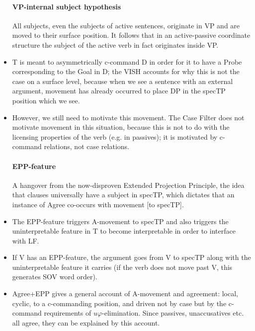 \documentclass{article}
\begin{document}
\begin{itemize}
    \paragraph{VP-internal subject hypothesis} All subjects, even the subjects of active sentences, originate in VP and are moved to their surface position. It follows that in an active-passive coordinate structure the subject of the active verb in fact originates inside VP.
    \item T is meant to asymmetrically c-command D in order for it to have a Probe corresponding to the Goal in D; the VISH accounts for why this is not the case on a surface level, because when we see a sentence with an external argument, movement has already occurred to place DP in the specTP position which we see.
    \item However, we still need to motivate this movement. The Case Filter does not motivate movement in this situation, because this is not to do with the licensing properties of the verb (e.g. in passives); it is motivated by c-command relations, not case relations.
    \paragraph{EPP-feature} A hangover from the now-disproven Extended Projection Principle, the idea that clauses universally have a subject in specTP, which dictates that an instance of Agree co-occurs with movement [to specTP].
    \item The EPP-feature triggers A-movement to specTP and also triggers the uninterpretable feature in T to become interpretable in order to interface with LF.
    \item If V has an EPP-feature, the argument goes from V to specTP along with the uninterpretable feature it carries (if the verb does not move past V, this generates SOV word order).
    \item Agree+EPP gives a general account of A-movement and agreement: local, cyclic, to a c-commanding position, and driven not by case but by the c-command requirements of $u\varphi$-elimination. Since passives, unaccusatives etc. all agree, they can be explained by this account.

\end{itemize}
\end{document}
